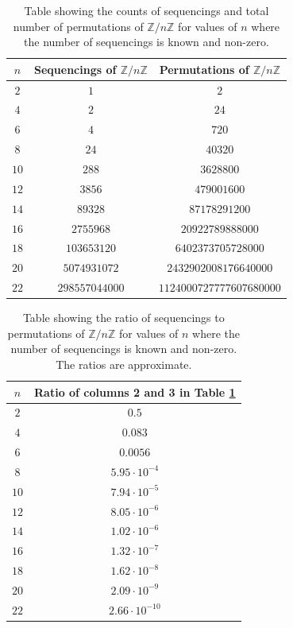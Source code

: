 \documentclass[12pt]{article}
\theoremstyle{plain}
\theoremstyle{definition}
\theoremstyle{remark}
\newcommand{\ZZ}{\mathbb{Z}}
\begin{document}
\begin{table}[H]
    \begin{center}
    \begin{tabular}{|c|c|c|}
            \hline
            $n$ & Sequencings of $\ZZ/n\ZZ$ & Permutations of $\ZZ/n\ZZ$\\
            \hline
            $2$ & $1$ & $2$ \\
            $4$ & $2$ & $24$ \\
            $6$ & $4$ & $720$ \\
            $8$ & $24$ & $40320$ \\
            $10$ & $288$ & $3628800$ \\
            $12$ & $3856$ & $479001600$ \\
            $14$ & $89328$ & $87178291200$ \\
            $16$ & $2755968$ & $20922789888000$ \\
            $18$  & $103653120$ & $6402373705728000$ \\
            $20$ & $5074931072$ & $2432902008176640000$ \\
            $22$ & $298557044000$ & $1124000727777607680000$ \\
            \hline
        \end{tabular}
    \end{center}
    \caption{Table showing the counts of sequencings and total number of permutations of $\ZZ/n\ZZ$ for values of $n$ where the number of sequencings is known and non-zero.}
    \label{tab:counts}
\end{table}

\begin{table}[H]
    \begin{center}
        \begin{tabular}{|c|c|}
        \hline
         $n$ &  Ratio of columns 2 and 3 in Table \ref{tab:counts}\\
         \hline
         $2$ & $0.5$\\
         $4$ & $0.083$\\
         $6$ & $0.0056$\\
         $8$ & $5.95\cdot10^{-4}$\\
         $10$ & $7.94\cdot 10^{-5}$\\
         $12$ & $8.05\cdot 10^{-6}$\\
         $14$ & $1.02\cdot10^{-6}$ \\
         $16$ & $1.32\cdot10^{-7}$\\
         $18$ & $1.62\cdot10^{-8}$\\
         $20$ & $2.09\cdot10^{-9}$\\
         $22$ & $2.66\cdot10^{-10}$\\
         \hline
    \end{tabular}
    \end{center}
    \caption{Table showing the ratio of sequencings to permutations of $\ZZ/n\ZZ$ for values of $n$ where the number of sequencings is known and non-zero. The ratios are approximate.}
    \label{tab:ratio}
\end{table}
\end{document}
